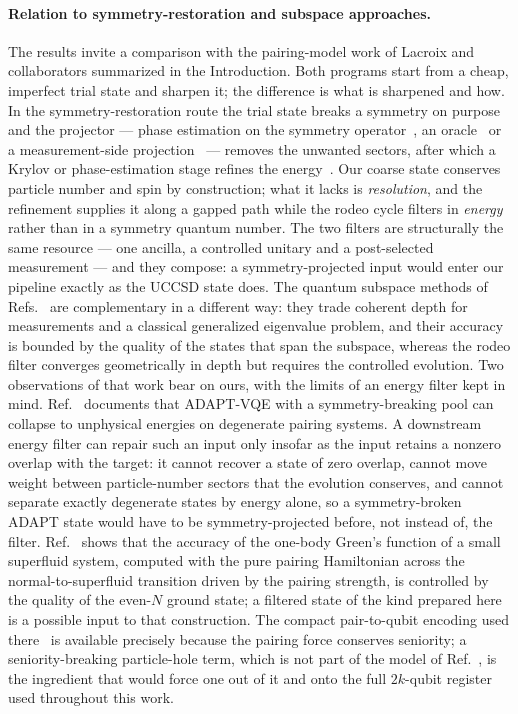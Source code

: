 \documentclass[
  aps,            %
  prc,            %
  reprint,        %
  superscriptaddress,
  floatfix,
  nofootinbib
]{revtex4-2}
\begin{document}
\paragraph{Relation to symmetry-restoration and subspace approaches.}
The results invite a comparison with the pairing-model work of Lacroix and
collaborators summarized in the Introduction.  Both programs start from a
cheap, imperfect trial state and sharpen it; the difference is what is
sharpened and how.  In the symmetry-restoration route the trial state breaks a
symmetry on purpose and the projector --- phase estimation on the symmetry
operator~\cite{Lacroix2020}, an oracle~\cite{RuizGuzman2023} or a
measurement-side projection~\cite{RuizGuzman2024} --- removes the unwanted
sectors, after which a Krylov or phase-estimation stage refines the
energy~\cite{RuizGuzman2022}.  Our coarse state conserves particle number and
spin by construction; what it lacks is \emph{resolution}, and the refinement
supplies it along a gapped path while the rodeo cycle filters in
\emph{energy} rather than in a symmetry quantum number.  The two filters are
structurally the same resource --- one ancilla, a controlled unitary and a
post-selected measurement --- and they compose: a symmetry-projected input
would enter our pipeline exactly as the UCCSD state does.  The quantum
subspace methods of Refs.~\cite{Zhang2025,AychetClaisse2026,BeaujeaultTaudiere2024}
are complementary in a different way: they trade coherent depth for
measurements and a classical generalized eigenvalue problem, and their
accuracy is bounded by the quality of the states that span the subspace,
whereas the rodeo filter converges geometrically in depth but requires the
controlled evolution.  Two observations of that work bear on ours, with the
limits of an energy filter kept in mind.  Ref.~\cite{Zhang2024} documents that
ADAPT-VQE with a symmetry-breaking pool can collapse to unphysical energies on
degenerate pairing systems.  A downstream energy filter can repair such an
input only insofar as the input retains a nonzero overlap with the target:
it cannot recover a state of zero overlap, cannot move weight between
particle-number sectors that the evolution conserves, and cannot separate
exactly degenerate states by energy alone, so a symmetry-broken ADAPT state
would have to be symmetry-projected before, not instead of, the filter.
Ref.~\cite{AychetClaisse2026} shows that the accuracy of the one-body Green's
function of a small superfluid system, computed with the pure pairing
Hamiltonian across the normal-to-superfluid transition driven by the pairing
strength, is controlled by the quality of the even-$N$ ground state; a
filtered state of the kind prepared here is a possible input to that
construction.  The compact pair-to-qubit encoding used
there~\cite{Lacroix2020,AychetClaisse2026} is available precisely because
the pairing force conserves seniority; a seniority-breaking particle-hole
term, which is not part of the model of Ref.~\cite{AychetClaisse2026}, is
the ingredient that would force one out of it and onto the full $2k$-qubit
register used throughout this work.
\end{document}
